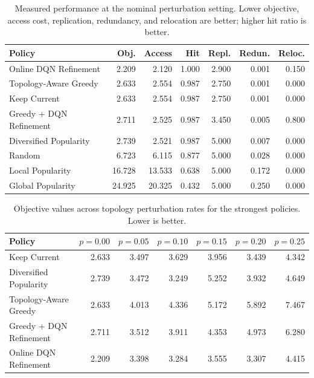 \begin{table}[t]
\centering
\caption{Measured performance at the nominal perturbation setting. Lower objective, access cost, replication, redundancy, and relocation are better; higher hit ratio is better.}
\label{tab:measured_results}
\scriptsize
\setlength{\tabcolsep}{2pt}
\begin{tabular}{lrrrrrr}
\toprule
Policy & Obj. & Access & Hit & Repl. & Redun. & Reloc. \\
\midrule
Online DQN Refinement & 2.209 & 2.120 & 1.000 & 2.900 & 0.001 & 0.150 \\
Topology-Aware Greedy & 2.633 & 2.554 & 0.987 & 2.750 & 0.001 & 0.000 \\
Keep Current & 2.633 & 2.554 & 0.987 & 2.750 & 0.001 & 0.000 \\
Greedy + DQN Refinement & 2.711 & 2.525 & 0.987 & 3.450 & 0.005 & 0.800 \\
Diversified Popularity & 2.739 & 2.521 & 0.987 & 5.000 & 0.007 & 0.000 \\
Random & 6.723 & 6.115 & 0.877 & 5.000 & 0.028 & 0.000 \\
Local Popularity & 16.728 & 13.533 & 0.638 & 5.000 & 0.172 & 0.000 \\
Global Popularity & 24.925 & 20.325 & 0.432 & 5.000 & 0.250 & 0.000 \\
\bottomrule
\end{tabular}
\end{table}

\begin{table}[t]
\centering
\caption{Objective values across topology perturbation rates for the strongest policies. Lower is better.}
\label{tab:perturbation_results}
\scriptsize
\setlength{\tabcolsep}{2pt}
\begin{tabular}{lrrrrrr}
\toprule
Policy & $p=0.00$ & $p=0.05$ & $p=0.10$ & $p=0.15$ & $p=0.20$ & $p=0.25$ \\
\midrule
Keep Current & 2.633 & 3.497 & 3.629 & 3.956 & 3.439 & 4.342 \\
Diversified Popularity & 2.739 & 3.472 & 3.249 & 5.252 & 3.932 & 4.649 \\
Topology-Aware Greedy & 2.633 & 4.013 & 4.336 & 5.172 & 5.892 & 7.467 \\
Greedy + DQN Refinement & 2.711 & 3.512 & 3.911 & 4.353 & 4.973 & 6.280 \\
Online DQN Refinement & 2.209 & 3.398 & 3.284 & 3.555 & 3.307 & 4.415 \\
\bottomrule
\end{tabular}
\end{table}

